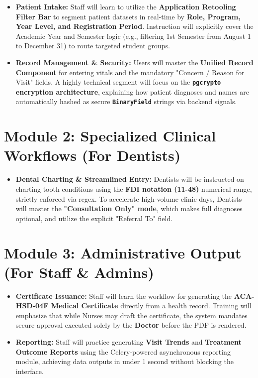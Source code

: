 \begin{itemize}
    \item \textbf{Patient Intake:} Staff will learn to utilize the \textbf{Application Retooling Filter Bar} to segment patient datasets in real-time by \textbf{Role, Program, Year Level, and Registration Period}. Instruction will explicitly cover the Academic Year and Semester logic (e.g., filtering 1st Semester from August 1 to December 31) to route targeted student groups.
    \item \textbf{Record Management \& Security:} Users will master the \textbf{Unified Record Component} for entering vitals and the mandatory "Concern / Reason for Visit" fields. A highly technical segment will focus on the \textbf{\texttt{pgcrypto} encryption architecture}, explaining how patient diagnoses and names are automatically hashed as secure \textbf{\texttt{BinaryField}} strings via backend signals.
\end{itemize}

\section{Module 2: Specialized Clinical Workflows (For Dentists)}

\begin{itemize}
    \item \textbf{Dental Charting \& Streamlined Entry:} Dentists will be instructed on charting tooth conditions using the \textbf{FDI notation (11-48)} numerical range, strictly enforced via regex. To accelerate high-volume clinic days, Dentists will master the \textbf{"Consultation Only" mode}, which makes full diagnoses optional, and utilize the explicit "Referral To" field.
\end{itemize}

\section{Module 3: Administrative Output (For Staff \& Admins)}

\begin{itemize}
    \item \textbf{Certificate Issuance:} Staff will learn the workflow for generating the \textbf{ACA-HSD-04F Medical Certificate} directly from a health record. Training will emphasize that while Nurses may draft the certificate, the system mandates secure approval executed solely by the \textbf{Doctor} before the PDF is rendered.
    \item \textbf{Reporting:} Staff will practice generating \textbf{Visit Trends} and \textbf{Treatment Outcome Reports} using the Celery-powered asynchronous reporting module, achieving data outputs in under 1 second without blocking the interface.
\end{itemize}

